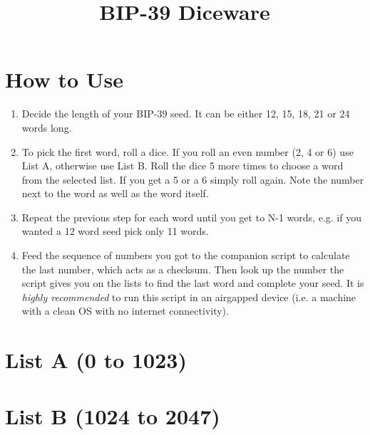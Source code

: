 \documentclass{article}
\title{BIP-39 Diceware}
\author{}
\date{}
\begin{document}
\maketitle

\section*{How to Use}

\begin{enumerate}
\item Decide the length of your BIP-39 seed. It can be either 12, 15, 18, 21 or 24 words long.
\item To pick the first word, roll a dice. If you roll an even number (2, 4 or 6) use List A, otherwise use List B.
Roll the dice 5 more times to choose a word from the selected list. If you get a 5 or a 6 simply roll again.
Note the number next to the word as well as the word itself.
\item Repeat the previous step for each word until you get to N-1 words, e.g. if you wanted a 12 word seed pick only 11 words.
\item Feed the sequence of numbers you got to the companion script to calculate the last number, which acts as a checksum.
Then look up the number the script gives you on the lists to find the last word and complete your seed.
It is \emph{highly recommended} to run this script in an airgapped device (i.e. a machine with a clean OS with no internet connectivity).
\end{enumerate}

\section*{List A (0 to 1023)}
\begin{multicols}{4}
\begin{small}

\end{small}
\end{multicols}

\clearpage

\section*{List B (1024 to 2047)}
\begin{multicols}{4}
\begin{small}

\end{small}
\end{multicols}
\end{document}
